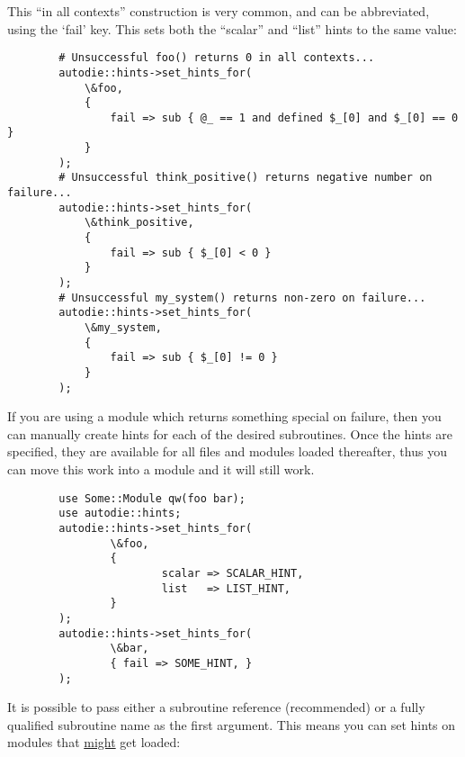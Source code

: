 \documentclass[]{article}
\renewcommand{\emph}[1]{\underline{#1}}
\begin{document}
This ``in all contexts'' construction is very common, and can be
abbreviated, using the `fail' key. This sets both the ``scalar'' and
``list'' hints to the same value:

\begin{verbatim}
        # Unsuccessful foo() returns 0 in all contexts...
        autodie::hints->set_hints_for(
            \&foo,
            {
                fail => sub { @_ == 1 and defined $_[0] and $_[0] == 0 }
            }
        );
        # Unsuccessful think_positive() returns negative number on failure...
        autodie::hints->set_hints_for(
            \&think_positive,
            {
                fail => sub { $_[0] < 0 }
            }
        );
        # Unsuccessful my_system() returns non-zero on failure...
        autodie::hints->set_hints_for(
            \&my_system,
            {
                fail => sub { $_[0] != 0 }
            }
        );
\end{verbatim}


If you are using a module which returns something special on failure,
then you can manually create hints for each of the desired subroutines.
Once the hints are specified, they are available for all files and
modules loaded thereafter, thus you can move this work into a module and
it will still work.

\begin{verbatim}
        use Some::Module qw(foo bar);
        use autodie::hints;
        autodie::hints->set_hints_for(
                \&foo,
                {
                        scalar => SCALAR_HINT,
                        list   => LIST_HINT,
                }
        );
        autodie::hints->set_hints_for(
                \&bar,
                { fail => SOME_HINT, }
        );
\end{verbatim}

It is possible to pass either a subroutine reference (recommended) or a
fully qualified subroutine name as the first argument. This means you
can set hints on modules that \emph{might} get loaded:
\end{document}

